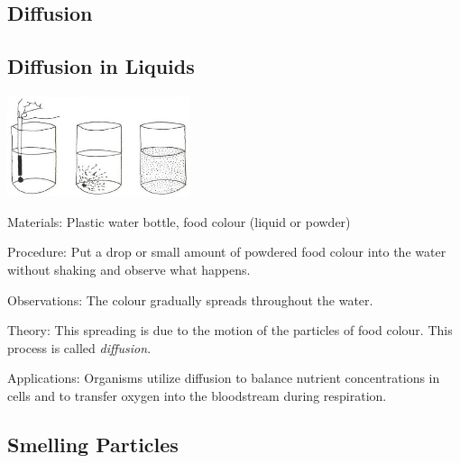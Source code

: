 \begin{multicols}{2}
\columnbreak


\section*{Diffusion}

\subsection{Diffusion in Liquids}

\begin{center}
\includegraphics[width=0.4\textwidth]{./img/vso/diffusion.jpg}
\end{center}

\begin{description*}
\item[Materials:]{Plastic water bottle, food colour (liquid or powder)}
\item[Procedure:]{Put a drop or small amount of powdered food colour into the water without shaking and observe what happens.}
\item[Observations:]{The colour gradually spreads throughout the water.}
\item[Theory:]{This spreading is due to the motion of the particles of food colour. This process is called \emph{diffusion}.}
\item[Applications:]{Organisms utilize diffusion to balance nutrient concentrations in cells and to transfer oxygen into the bloodstream during respiration.}
\end{description*}

\subsection{Smelling Particles}


\end{multicols}
